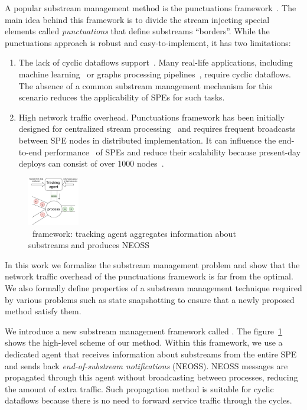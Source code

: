 A popular substream management method is the punctuations framework~\cite{tucker2003exploiting}. The main idea behind this framework is to divide the stream injecting special elements called {\em punctuations} that define substreams ``borders''. While the punctuations approach is robust and easy-to-implement, it has two limitations:
\begin{enumerate}
    \item The lack of cyclic dataflows support~\cite{carbone2018scalable}. Many real-life applications, including machine learning~\cite{webirte} or graphs processing pipelines~\cite{xu2018fault}, require cyclic dataflows. The absence of a common substream management mechanism for this scenario reduces the applicability of SPEs for such tasks.
    \item High network traffic overhead. Punctuations framework has been initially designed for centralized stream processing~\cite{Tucker:2003:EPS:776752.776780} and requires frequent broadcasts between SPE nodes in distributed implementation. It can influence the end-to-end performance~\cite{DBLP:journals/pvldb/BegoliACHKKMS21} of SPEs and reduce their scalability because present-day deploys can consist of over 1000 nodes~\cite{Carbone:2017:SMA:3137765.3137777}. 
\end{enumerate}

\begin{figure}[t]
  \centering
  \includegraphics[width=0.20\textwidth]{pics/tracker-scheme.pdf}
  \caption{\tracker\ framework: tracking agent aggregates information about substreams and produces NEOSS}
  \label{tracker_scheme}
\end{figure}

In this work we formalize the substream management problem and show that the network traffic overhead of the punctuations framework is far from the optimal. We also formally define properties of a substream management technique required by various problems such as state snapshotting to ensure that a newly proposed method satisfy them. 

We introduce a new substream management framework called \tracker. The figure~\ref{tracker_scheme} shows the high-level scheme of our method. 
Within this framework, we use a dedicated agent that receives information about substreams from the entire SPE and sends back {\em end-of-substream notifications} (NEOSS). 
NEOSS messages are propagated through this agent without broadcasting between processes, reducing the amount of extra traffic. Such propagation method is suitable for cyclic dataflows because there is no need to forward service traffic through the cycles.

